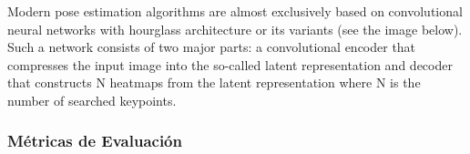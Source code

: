 Modern pose estimation algorithms are almost exclusively based on convolutional neural networks
with hourglass architecture or its variants (see the image below). Such a network consists of two
major parts: a convolutional encoder that compresses the input image into the so-called latent
representation and decoder that constructs N heatmaps from the latent representation where N is the
number of searched keypoints.

\subsubsection{Métricas de Evaluación}





